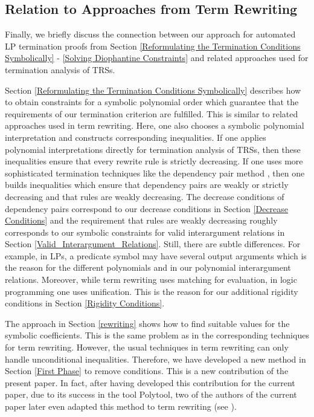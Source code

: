 \documentclass[envcountsame]{tlp}
\newcounter{ex:der-lastsymconsctr}
\begin{document}
\subsection{Relation to Approaches from Term Rewriting}
\label{Discussion}

Finally, we briefly discuss the connection between our approach for automated
LP termination proofs  from Section \ref{Reformulating 
the Termination Conditions Symbolically} - \ref{Solving Diophantine Constraints} and related approaches used for
termination analysis of TRSs.

Section \ref{Reformulating 
the Termination Conditions Symbolically} describes how to obtain constraints for a
symbolic polynomial order which guarantee that the requirements
of our termination criterion are fulfilled. This is similar
to related approaches used in term rewriting. Here, one also chooses
a symbolic polynomial interpretation and constructs
corresponding inequalities.
If one applies polynomial interpretations
directly for termination analysis of TRSs, then these
inequalities ensure that every rewrite rule is strictly decreasing.
If one uses more sophisticated termination techniques like the
dependency pair method \cite{ArtsGiesl00,JAR07,Hirokawa_Middeldorp04}, then one
builds inequalities which ensure 
that dependency pairs are weakly or strictly decreasing and that
rules are weakly decreasing. The decrease conditions of
dependency pairs correspond to our decrease conditions in Section \ref{Decrease Conditions}
and the requirement that rules are weakly decreasing roughly
corresponds to our symbolic constraints for valid interargument
relations in Section \ref{Valid_Interargument_Relations}. Still, there are
subtle
differences. For example, in
LPs, a predicate symbol may have several output arguments which is the
reason for the different polynomials  and  in our polynomial
interargument relations. Moreover, while term rewriting uses matching
for evaluation, in logic programming one uses unification. This is the
reason for our additional rigidity conditions in Section \ref{Rigidity Conditions}.

The approach in Section \ref{rewriting} shows how to find suitable values for
the symbolic coefficients. This is the same problem as in
the corresponding techniques for term rewriting. However, the
usual techniques in term rewriting can only handle unconditional
inequalities. Therefore, we have developed a new method in Section \ref{First Phase}
to remove conditions. This is a new contribution of the present paper.
In fact, after having developed this contribution for the current paper, due
to its success in the tool \textsf{Polytool}, two of the authors
of the current paper later even adapted this method to term rewriting (see
\cite[Footnote 14]{MAXPOLO}). 
\end{document}
